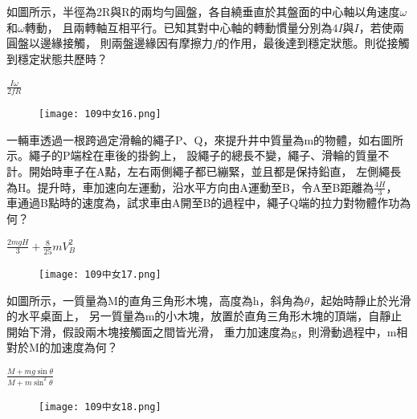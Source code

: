 \documentclass[cn,10pt,math=newtx]{elegantbook}
\begin{document}
\begin{example}
  如圖所示，半徑為2R與R的兩均勻圓盤，各自繞垂直於其盤面的中心軸以角速度$\omega$和$\omega$轉動，
  且兩轉軸互相平行。已知其對中心軸的轉動慣量分別為$4I$與$I$，若使兩圓盤以邊緣接觸，
  則兩盤邊緣因有摩擦力$f$的作用，最後達到穩定狀態。則從接觸到穩定狀態共歷時？\\
  \rightline{[台中女中教甄109]} 
\end{example}
\begin{solution}
  $\frac{I \omega}{2fR}$
\end{solution}
\begin{figure}[htbp]
  \flushright
  \texttt{[image: 109中女16.png]}
\end{figure}
\newpage

\begin{example}
  一輛車透過一根跨過定滑輪的繩子P、Q，來提升井中質量為m的物體，如右圖所示。繩子的P端栓在車後的掛鉤上，
  設繩子的總長不變，繩子、滑輪的質量不計。開始時車子在A點，左右兩側繩子都已繃緊，並且都是保持鉛直，
  左側繩長為H。提升時，車加速向左運動，沿水平方向由A運動至B，令A至B距離為$\frac{4H}{3}$，
  車通過B點時的速度為，試求車由A開至B的過程中，繩子Q端的拉力對物體作功為何？\\
  \rightline{[台中女中教甄109]} 
\end{example}
\begin{solution}
  $\frac{2mgH}{3}+\frac{8}{25}mV_{B}^2$
\end{solution}
\begin{figure}[htbp]
  \flushright
  \texttt{[image: 109中女17.png]}
\end{figure}
\newpage

\begin{example}
  如圖所示，一質量為M的直角三角形木塊，高度為h，斜角為$\theta$，起始時靜止於光滑的水平桌面上，
  另一質量為m的小木塊，放置於直角三角形木塊的頂端，自靜止開始下滑，假設兩木塊接觸面之間皆光滑，
  重力加速度為g，則滑動過程中，m相對於M的加速度為何？\\
  \rightline{[台中女中教甄109]} 
\end{example}
\begin{solution}
  $\frac{M+mg\sin\theta}{M+m\sin ^2 \theta}$
\end{solution}
\begin{figure}[htbp]
  \flushright
  \texttt{[image: 109中女18.png]}
\end{figure}
\newpage
\end{document}

